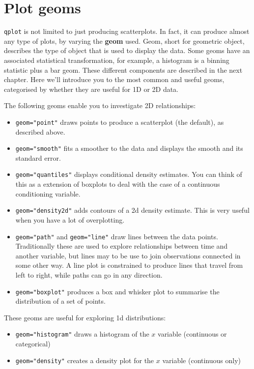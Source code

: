 \section{Plot geoms}\label{sec:plot_geoms}

{\tt qplot} is not limited to just producing scatterplots.  In fact, it can produce almost any type of plots, by varying the {\bf geom} used. Geom, short for geometric object, describes the type of object that is used to display the data.  Some geoms have an associated statistical transformation, for example, a histogram is a binning statistic plus a bar geom.  These different components are described in the next chapter.  Here we'll introduce you to the most common and useful geoms, categorised by whether they are useful for 1D or 2D data.

The following geoms enable you to investigate 2D relationships:

\begin{itemize}
	\item {\tt geom="point"} draws points to produce a scatterplot (the default), as described above.
	\item {\tt geom="smooth"} fits a smoother to the data and displays the smooth and its standard error.
	\item {\tt geom="quantiles"} displays conditional density estimates.  You can think of this as a extension of boxplots to deal with the case of a continuous conditioning variable.
	\item {\tt geom="density2d"} adds contours of a 2d density estimate.  This is very useful when you have a lot of overplotting.
	\item {\tt geom="path"} and {\tt geom="line"} draw lines between the data points.  Traditionally these are used to explore relationships between time and another variable, but lines may to be use to join observations connected in some other way.  A line plot is constrained to produce lines that travel from left to right, while paths can go in any direction.
	\item {\tt geom="boxplot"} produces a box and whisker plot to summarise the distribution of a set of points.
\end{itemize}

These geoms are useful for exploring 1d distributions:

\begin{itemize}
	\item {\tt geom="histogram"} draws a histogram of the $x$ variable (continuous or categorical)
	\item {\tt geom="density"} creates a density plot for the $x$ variable (continuous only)
\end{itemize}

